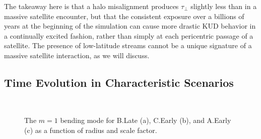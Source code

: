 The takeaway here is that a halo misalignment produces $\tau_\perp$ slightly less than in a massive satellite encounter, but that the consistent exposure over a billions of years at the beginning of the simulation can cause more drastic KUD behavior in a continually excited fashion, rather than simply at each pericentric passage of a satellite. The presence of low-latitude streams cannot be a unique signature of a massive satellite interaction, as we will discuss.
 
\subsection{Time Evolution in Characteristic Scenarios} \label{ssec:mean_height}




\begin{figure}
	\centering
	\\
		\caption{The $m=1$ bending mode for B.Late (a), C.Early (b), and A.Early (c) as a function of radius and scale factor. }
\end{figure}


